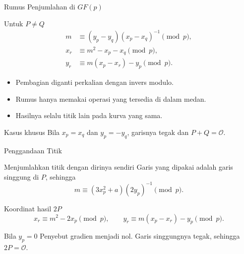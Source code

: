 \documentclass[aspectratio=169,11pt]{beamer}
\begin{document}
\begin{frame}{Rumus Penjumlahan di $GF(p)$}
    \begin{block}{Untuk $P \neq Q$}
        \[
        \begin{aligned}
            m   &\equiv (y_p - y_q)(x_p - x_q)^{-1} \pmod p, \\
            x_r &\equiv m^2 - x_p - x_q \pmod p, \\
            y_r &\equiv m(x_p - x_r) - y_p \pmod p .
        \end{aligned}
        \]
    \end{block}
    \vspace{0.1cm}
    \begin{itemize}
        \item Pembagian diganti perkalian dengan invers modulo.
        \item Rumus hanya memakai operasi yang tersedia di dalam medan.
        \item Hasilnya selalu titik lain pada kurva yang sama.
    \end{itemize}
    \begin{alertblock}{Kasus khusus}
        \footnotesize
        Bila $x_p = x_q$ dan $y_p = -y_q$, garisnya tegak dan
        $P + Q = \mathcal{O}$.
    \end{alertblock}
\end{frame}

\begin{frame}{Penggandaan Titik}
    \begin{block}{Menjumlahkan titik dengan dirinya sendiri}
        Garis yang dipakai adalah garis singgung di $P$, sehingga
        \[
            m \equiv (3x_p^2 + a)(2y_p)^{-1} \pmod p .
        \]
    \end{block}
    \vspace{0.05cm}
    \begin{block}{Koordinat hasil $2P$}
        \[
            x_r \equiv m^2 - 2x_p \pmod p,
            \qquad
            y_r \equiv m(x_p - x_r) - y_p \pmod p .
        \]
    \end{block}
    \vspace{0.05cm}
    \begin{alertblock}{Bila $y_p = 0$}
        \footnotesize
        Penyebut gradien menjadi nol. Garis singgungnya tegak, sehingga
        $2P = \mathcal{O}$.
    \end{alertblock}
\end{frame}
\end{document}
